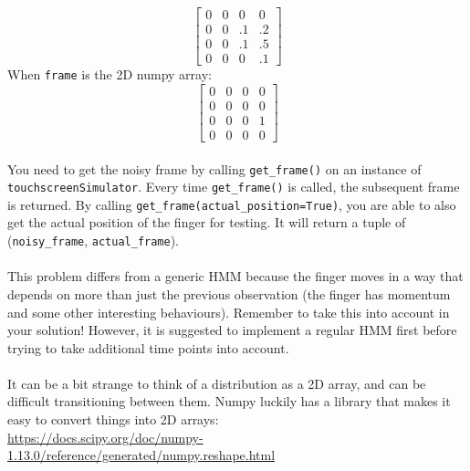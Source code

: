 \documentclass{article}
\begin{document}
    $$
    \begin{bmatrix}
        0 & 0 & 0 & 0 \\
        0 & 0 & .1 & .2 \\
        0 & 0 & .1 & .5 \\
        0 & 0 & 0 & .1
    \end{bmatrix}
    $$
    When \texttt{frame} is the 2D numpy array:
    $$
    \begin{bmatrix}
        0 & 0 & 0 & 0 \\
        0 & 0 & 0 & 0 \\
        0 & 0 & 0 & 1 \\
        0 & 0 & 0 & 0
    \end{bmatrix}
    $$
    \\
    You need to get the noisy frame by calling \texttt{get\_frame()} on an instance of \texttt{touchscreenSimulator}. Every time \texttt{get\_frame()} is called, the subsequent frame is returned. By calling \texttt{get\_frame(actual\_position=True)}, you are able to also get the actual position of the finger for testing. It will return a tuple of (\texttt{noisy\_frame}, \texttt{actual\_frame}).\\\\
    This problem differs from a generic HMM because the finger moves in a way that depends on more than just the previous observation (the finger has momentum and some other interesting behaviours). Remember to take this into account in your solution! However, it is suggested to implement a regular HMM first before trying to take additional time points into account.\\\\
    It can be a bit strange to think of a distribution as a 2D array, and can be difficult transitioning between
    them. Numpy luckily has a library that makes it easy to convert things into 2D arrays:\\
    \url{https://docs.scipy.org/doc/numpy-1.13.0/reference/generated/numpy.reshape.html}
\end{document}
